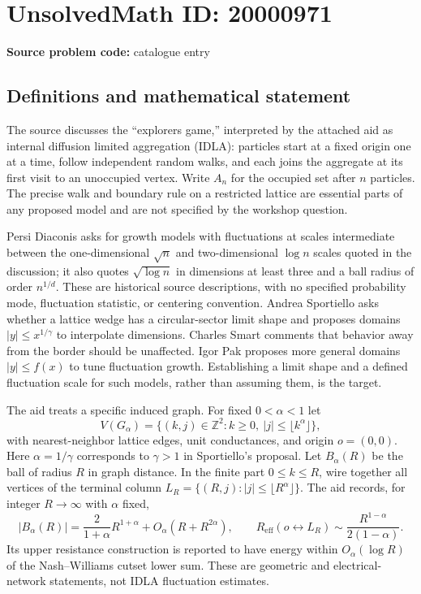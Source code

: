 \documentclass[11pt]{article}
\newcommand{\Z}{\mathbb{Z}}
\begin{document}
\section*{UnsolvedMath ID: 20000971}
\textbf{Source problem code:} catalogue entry
\subsection{Definitions and mathematical statement}
The source discusses the ``explorers game,'' interpreted by the attached aid as internal diffusion limited aggregation (IDLA): particles start at a fixed origin one at a time, follow independent random walks, and each joins the aggregate at its first visit to an unoccupied vertex. Write $A_n$ for the occupied set after $n$ particles. The precise walk and boundary rule on a restricted lattice are essential parts of any proposed model and are not specified by the workshop question.

Persi Diaconis asks for growth models with fluctuations at scales intermediate between the one-dimensional $\sqrt n$ and two-dimensional $\log n$ scales quoted in the discussion; it also quotes $\sqrt{\log n}$ in dimensions at least three and a ball radius of order $n^{1/d}$. These are historical source descriptions, with no specified probability mode, fluctuation statistic, or centering convention. Andrea Sportiello asks whether a lattice wedge has a circular-sector limit shape and proposes domains $|y|\leq x^{1/\gamma}$ to interpolate dimensions. Charles Smart comments that behavior away from the border should be unaffected. Igor Pak proposes more general domains $|y|\leq f(x)$ to tune fluctuation growth. Establishing a limit shape and a defined fluctuation scale for such models, rather than assuming them, is the target.

The aid treats a specific induced graph. For fixed $0<\alpha<1$ let
\[
 V(G_\alpha)=\{(k,j)\in\Z^2:k\geq0,\ |j|\leq\lfloor k^\alpha\rfloor\},
\]
with nearest-neighbor lattice edges, unit conductances, and origin $o=(0,0)$. Here $\alpha=1/\gamma$ corresponds to $\gamma>1$ in Sportiello's proposal. Let $B_\alpha(R)$ be the ball of radius $R$ in graph distance. In the finite part $0\leq k\leq R$, wire together all vertices of the terminal column $L_R=\{(R,j):|j|\leq\lfloor R^\alpha\rfloor\}$. The aid records, for integer $R\to\infty$ with $\alpha$ fixed,
\[
 |B_\alpha(R)|=\frac{2}{1+\alpha}R^{1+\alpha}+O_\alpha(R+R^{2\alpha}),\qquad
 R_{\mathrm{eff}}(o\leftrightarrow L_R)\sim\frac{R^{1-\alpha}}{2(1-\alpha)}.
\]
Its upper resistance construction is reported to have energy within $O_\alpha(\log R)$ of the Nash--Williams cutset lower sum. These are geometric and electrical-network statements, not IDLA fluctuation estimates.
\end{document}
